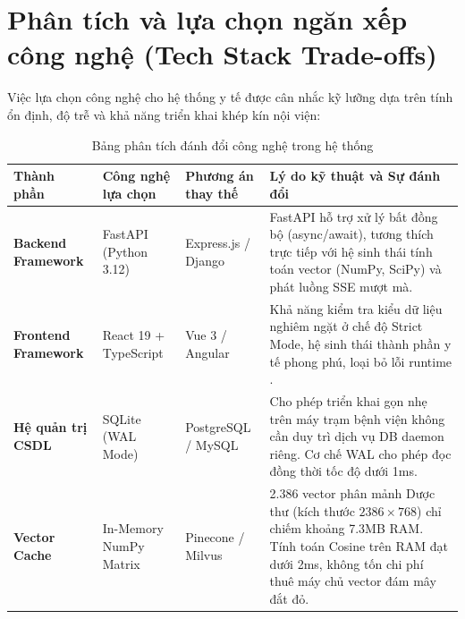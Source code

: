 \section{Phân tích và lựa chọn ngăn xếp công nghệ (Tech Stack Trade-offs)}
\label{sec:tech_stack_tradeoffs}

Việc lựa chọn công nghệ cho hệ thống y tế được cân nhắc kỹ lưỡng dựa trên tính ổn định, độ trễ và khả năng triển khai khép kín nội viện:

\begin{table}[htbp]
\centering
\small
\begin{tabularx}{\textwidth}{L{2.8cm} L{3.5cm} L{3.5cm} Y}
\toprule
\textbf{Thành phần} & \textbf{Công nghệ lựa chọn} & \textbf{Phương án thay thế} & \textbf{Lý do kỹ thuật và Sự đánh đổi} \\
\midrule
\textbf{Backend Framework} & FastAPI (Python 3.12) & Express.js / Django & FastAPI hỗ trợ xử lý bất đồng bộ (async/await), tương thích trực tiếp với hệ sinh thái tính toán vector (NumPy, SciPy) và phát luồng SSE mượt mà. \\
\addlinespace
\textbf{Frontend Framework} & React 19 + TypeScript & Vue 3 / Angular & Khả năng kiểm tra kiểu dữ liệu nghiêm ngặt ở chế độ Strict Mode, hệ sinh thái thành phần y tế phong phú, loại bỏ lỗi runtime . \\
\addlinespace
\textbf{Hệ quản trị CSDL} & SQLite (WAL Mode) & PostgreSQL / MySQL & Cho phép triển khai gọn nhẹ trên máy trạm bệnh viện không cần duy trì dịch vụ DB daemon riêng. Cơ chế WAL cho phép đọc đồng thời tốc độ dưới 1ms. \\
\addlinespace
\textbf{Vector Cache} & In-Memory NumPy Matrix & Pinecone / Milvus & 2.386 vector phân mảnh Dược thư (kích thước $2386 \times 768$) chỉ chiếm khoảng 7.3MB RAM. Tính toán Cosine trên RAM đạt dưới 2ms, không tốn chi phí thuê máy chủ vector đám mây đắt đỏ. \\
\bottomrule
\end{tabularx}
\caption{Bảng phân tích đánh đổi công nghệ trong hệ thống}
\end{table}
